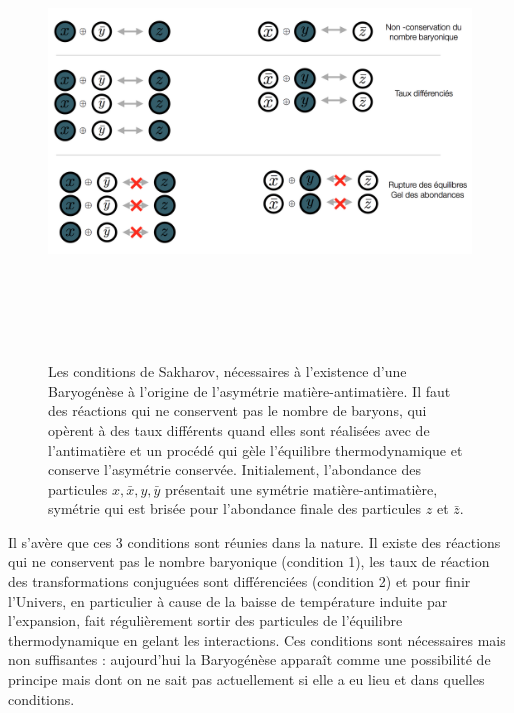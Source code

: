 \begin{figure}[htbp]
	\centering
		\includegraphics[height=12cm]{figs/sakharov.png}
	\caption[Les conditions de Sakharov]{Les conditions de Sakharov, nécessaires à l'existence d'une Baryogénèse à l'origine de l'asymétrie matière-antimatière. Il faut des réactions qui ne conservent pas le nombre de baryons, qui opèrent à des taux différents quand elles sont réalisées avec de l'antimatière et un procédé qui gèle l'équilibre thermodynamique et conserve l'asymétrie conservée. Initialement, l'abondance des particules $x,\bar x, y, \bar y$ présentait une symétrie matière-antimatière, symétrie qui est brisée pour l'abondance finale des particules $z$ et $\bar z$.}
	\label{f:sakharov}
\end{figure}

 Il s'avère que ces 3 conditions sont réunies dans la nature. Il existe des réactions qui ne conservent pas le nombre baryonique (condition 1), les taux de réaction des transformations conjuguées sont différenciées (condition 2) et pour finir l'Univers, en particulier à cause de la baisse de température induite par l'expansion, fait régulièrement sortir des particules de l'équilibre thermodynamique en gelant les interactions. Ces conditions sont nécessaires mais non suffisantes : aujourd'hui la Baryogénèse apparaît comme une possibilité de principe mais dont on ne sait pas actuellement si elle a eu lieu et dans quelles conditions.
 